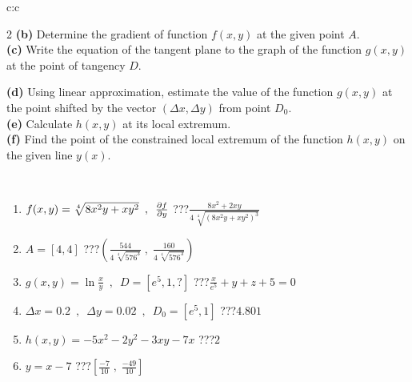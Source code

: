\documentclass[10pt]{report}
\begin{document}
\begin{tabular}{c:c}
\begin{minipage}[c][104.5mm][t]{0.5\linewidth}
\begin{center}
\begin{minipage}{0.95\linewidth}
\begin{center}
{\begin{multicols}{2}
\textbf{(b)} Determine the gradient of function \(f(x,y)\) at the given point \(A\). \\[1mm]
\textbf{(c)} Write the equation of the tangent plane to the graph of the function \(g(x,y)\) at the point of tangency \(D\). \par \columnbreak
\textbf{(d)} Using linear approximation, estimate the value of the function \(g(x,y)\) at the point shifted by the vector \((\Delta x, \Delta y)\) from point \(D_0\). \\[1mm]
\textbf{(e)} Calculate \(h(x,y)\) at its local extremum. \\[1mm]
\textbf{(f)} Find the point of the constrained local extremum of the function \(h(x,y)\) on the given line \(y(x)\). \\[1mm]
\end{multicols}
}
\end{center}
\end{minipage}
\\[4mm]
\begin{minipage}{0.79\linewidth}
\begin{center}
\begin{varwidth}{\linewidth}
\begin{enumerate}
\normalsizerr
\item $f(x,y) = \sqrt[4]{8x^2y + xy^2}\enspace , \enspace \pdv{f}{y}$\quad \dotfill\; ???\;\dotfill \quad $\frac{8x^2+2xy}{4\,\sqrt[4]{(8x^2y+xy^2)^{3}}}$
\item $A = [4, 4]$\quad \dotfill\; ???\;\dotfill \quad $\left( \frac{544}{4\,\sqrt[4]{576^3}} \;,\; \frac{160}{4\,\sqrt[4]{576^3}} \right)$
\item $g(x,y) = \ln\frac{x}{y} \enspace , \enspace D=[e^{5},1,?]$\quad \dotfill\; ???\;\dotfill \quad $\frac{x}{e^5} + y + z + 5 = 0$
\item $\Delta x = {0.2} \enspace,\enspace \Delta y = {0.02} \enspace,\enspace D_0 = [e^{5},1]$\quad \dotfill\; ???\;\dotfill \quad $4.801$
\item $h(x,y) = -5x^2-2y^2-3xy-7x$\quad \dotfill\; ???\;\dotfill \quad $2$
\item $y = x-7$\quad \dotfill\; ???\;\dotfill \quad $\left[\frac{-7}{10}\;,\;\frac{-49}{10}\right]$
\end{enumerate}
\end{varwidth}
\end{center}
\end{minipage}
\begin{minipage}{0.20\linewidth}
\begin{center}

\end{center}
\end{minipage}
\end{center}
\end{minipage}
\end{tabular}
\end{document}
